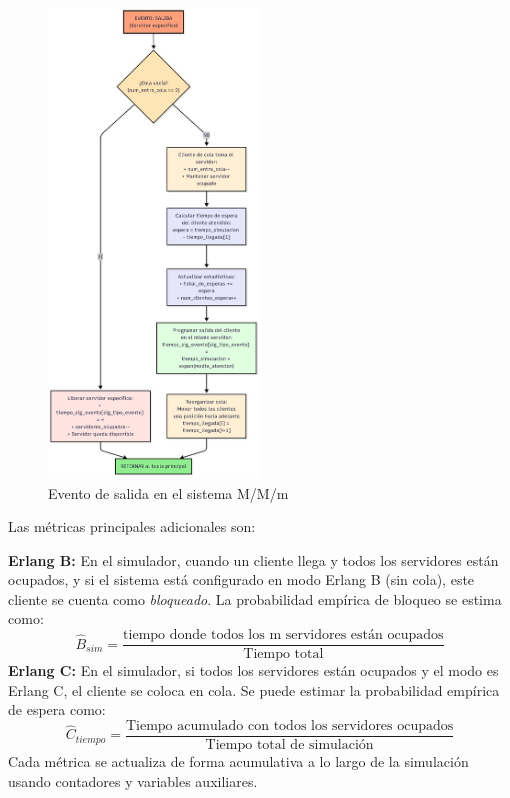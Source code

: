 \documentclass{article}
\begin{document}
\begin{itemize}
\begin{figure}[H]
    \centering
    \includegraphics[width=0.5\textwidth]{images/flujos/ErlangSalida.png}
    \caption{Evento de salida en el sistema M/M/m}
    \label{fig:mm_m_salida}
\end{figure}
\end{itemize}

Las métricas principales adicionales son:

\textbf{Erlang B:} En el simulador, cuando un cliente llega y todos los servidores están ocupados, y si el sistema está configurado en modo Erlang B (sin cola), este cliente se cuenta como \textit{bloqueado}. La probabilidad empírica de bloqueo se estima como:
    \[
        \hat{B}_{sim} = \frac{\text{tiempo donde todos los m servidores están ocupados}}{\text{Tiempo total}}
    \]
\textbf{Erlang C:} En el simulador, si todos los servidores están ocupados y el modo es Erlang C, el cliente se coloca en cola. Se puede estimar la probabilidad empírica de espera como:
    \[
        \hat{C}_{tiempo} = \frac{\text{Tiempo acumulado con todos los servidores ocupados}}{\text{Tiempo total de simulación}}
    \]
Cada métrica se actualiza de forma acumulativa a lo largo de la simulación usando contadores y variables auxiliares.
\end{document}
